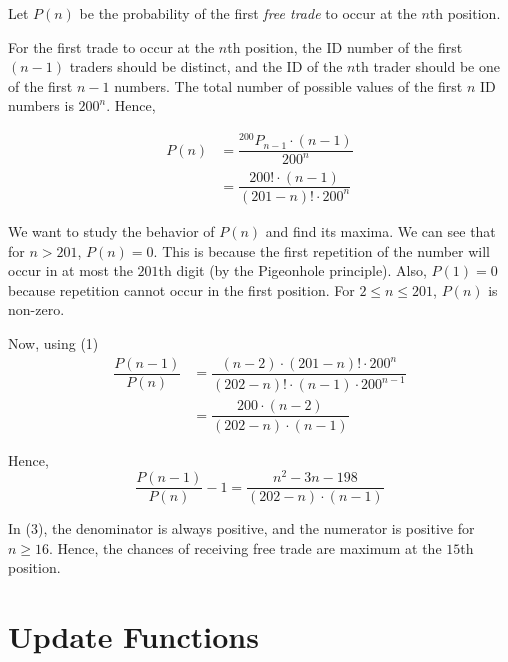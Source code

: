 \documentclass{article}
\newcommand*{\Perm}[2]{{}^{#1}P_{#2}}
\begin{document}
Let $P(n)$ be the probability of the first \textit{free trade} to occur at the $n$th position. 

For the first trade to occur at the $n$th position, the ID number of the first $(n-1)$ traders should be distinct, and the ID of the $n$th trader should be one of the first $n-1$ numbers. The total number of possible values of the first $n$ ID numbers is $200^n$. Hence,

\begin{equation}
\begin{aligned}
    P(n) &= \dfrac{\Perm{200}{n-1} \cdot (n-1)}{200^n} \\
         &= \dfrac{200! \cdot (n-1)}{(201-n)! \cdot 200^n}
\end{aligned}
\end{equation}

We want to study the behavior of $P(n)$ and find its maxima. We can see that for $n>201$, $P(n)=0$. This is because the first repetition of the number will occur in at most the $201$th digit (by the Pigeonhole principle). Also, $P(1)=0$ because repetition cannot occur in the first position. For $2\le n\le 201$, $P(n)$ is non-zero.

Now, using (1)
\begin{equation}
\begin{aligned}
    \dfrac{P(n-1)}{P(n)} &= \dfrac{(n-2) \cdot (201-n)! \cdot 200^n}{(202-n)! \cdot (n-1) \cdot 200^{n-1}} \\
    &= \dfrac{200 \cdot (n-2)}{(202-n) \cdot (n-1)}
\end{aligned}
\end{equation}

Hence,
\begin{equation}
    \dfrac{P(n-1)}{P(n)}-1=\dfrac{n^2-3n-198}{(202-n)\cdot(n-1)}
\end{equation}

In (3), the denominator is always positive, and the numerator is positive for $n\ge 16$. Hence, the chances of receiving free trade are maximum at the $15$th position.

\setcounter{equation}{0}

\section{Update Functions}
\end{document}
